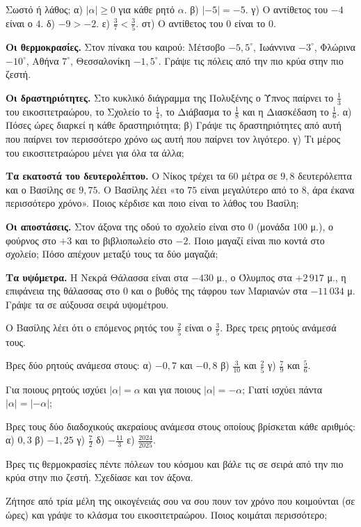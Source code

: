 \ex Σωστό ή λάθος; α) $|\alpha|\ge0$ για κάθε ρητό $\alpha$. \quad β) $|-5|=-5$. \quad γ) Ο αντίθετος του $-4$ είναι ο $4$. \quad δ) $-9>-2$. \quad ε) $\frac{3}{7}<\frac{3}{5}$. \quad στ) Ο αντίθετος του $0$ είναι το $0$.


\ex \textbf{Οι θερμοκρασίες.} Στον πίνακα του καιρού: Μέτσοβο $-5{,}5^\circ$, Ιωάννινα $-3^\circ$, Φλώρινα $-10^\circ$, Αθήνα $7^\circ$, Θεσσαλονίκη $-1{,}5^\circ$. Γράψε τις πόλεις από την πιο κρύα στην πιο ζεστή.

\ex \textbf{Οι δραστηριότητες.} Στο κυκλικό διάγραμμα της Πολυξένης ο Ύπνος παίρνει το $\frac{1}{3}$ του εικοσιτετραώρου, το Σχολείο το $\frac{1}{4}$, το Διάβασμα το $\frac{1}{8}$ και η Διασκέδαση το $\frac{1}{6}$. α) Πόσες ώρες διαρκεί η κάθε δραστηριότητα; β) Γράψε τις δραστηριότητες από αυτή που παίρνει τον περισσότερο χρόνο ως αυτή που παίρνει τον λιγότερο. γ) Τι μέρος του εικοσιτετραώρου μένει για όλα τα άλλα;

\ex \textbf{Τα εκατοστά του δευτερολέπτου.} Ο Νίκος τρέχει τα $60$ μέτρα σε $9{,}8$ δευτερόλεπτα και ο Βασίλης σε $9{,}75$. Ο Βασίλης λέει «το $75$ είναι μεγαλύτερο από το $8$, άρα έκανα περισσότερο χρόνο». Ποιος κέρδισε και ποιο είναι το λάθος του Βασίλη;

\ex \textbf{Οι αποστάσεις.} Στον άξονα της οδού το σχολείο είναι στο $0$ (μονάδα $100$ μ.), ο φούρνος στο $+3$ και το βιβλιοπωλείο στο $-2$. Ποιο μαγαζί είναι πιο κοντά στο σχολείο; Πόσο απέχουν μεταξύ τους τα δύο μαγαζιά;

\ex \textbf{Τα υψόμετρα.} Η Νεκρά Θάλασσα είναι στα $-430$ μ., ο Όλυμπος στα $+2\,917$ μ., η επιφάνεια της θάλασσας στο $0$ και ο βυθός της τάφρου των Μαριανών στα $-11\,034$ μ. Γράψε τα σε αύξουσα σειρά υψομέτρου.


\ex Ο Βασίλης λέει ότι ο επόμενος ρητός του $\frac{2}{5}$ είναι ο $\frac{3}{5}$. Βρες τρεις ρητούς ανάμεσά τους.

\ex Βρες δύο ρητούς ανάμεσα στους: α) $-0{,}7$ και $-0{,}8$ \quad β) $\frac{3}{10}$ και $\frac{2}{5}$ \quad γ) $\frac{7}{9}$ και $\frac{5}{6}$.

\ex Για ποιους ρητούς ισχύει $|\alpha|=\alpha$ και για ποιους $|\alpha|=-\alpha$; Γιατί ισχύει πάντα $|\alpha|=|-\alpha|$;

\ex Βρες τους δύο διαδοχικούς ακεραίους ανάμεσα στους οποίους βρίσκεται κάθε αριθμός: α) $0{,}3$ \quad β) $-1{,}25$ \quad γ) $\frac{7}{2}$ \quad δ) $-\frac{11}{3}$ \quad ε) $\frac{2024}{2025}$.


\ex Βρες τις θερμοκρασίες πέντε πόλεων του κόσμου και βάλε τις σε σειρά από την πιο κρύα στην πιο ζεστή. Σχεδίασε και τον άξονα.

\ex Ζήτησε από τρία μέλη της οικογένειάς σου να σου πουν τον χρόνο που κοιμούνται (σε ώρες) και γράψε το κλάσμα του εικοσιτετραώρου. Ποιος κοιμάται περισσότερο;
